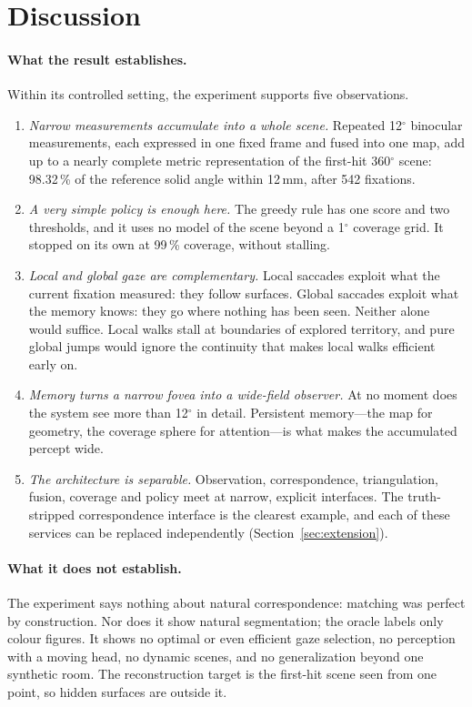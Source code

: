 \documentclass[11pt,a4paper]{article}
\newcommand{\pct}[1]{#1\,\%}
\newcommand{\degr}{\ensuremath{^\circ}}
\begin{document}
\section{Discussion}\label{sec:discussion}

\paragraph{What the result establishes.} Within its controlled setting, the experiment supports five observations.
\begin{enumerate}
  \item \emph{Narrow measurements accumulate into a whole scene.} Repeated 12\degr{} binocular measurements, each
        expressed in one fixed frame and fused into one map, add up to a nearly complete metric representation of the
        first-hit 360\degr{} scene: \pct{98.32} of the reference solid angle within 12\,mm, after 542 fixations.
  \item \emph{A very simple policy is enough here.} The greedy rule has one score and two thresholds, and it uses no
        model of the scene beyond a 1\degr{} coverage grid. It stopped on its own at \pct{99} coverage, without
        stalling.
  \item \emph{Local and global gaze are complementary.} Local saccades exploit what the current fixation measured:
        they follow surfaces. Global saccades exploit what the memory knows: they go where nothing has been seen.
        Neither alone would suffice. Local walks stall at boundaries of explored territory, and pure global jumps
        would ignore the continuity that makes local walks efficient early on.
  \item \emph{Memory turns a narrow fovea into a wide-field observer.} At no moment does the system see more than
        12\degr{} in detail. Persistent memory---the map for geometry, the coverage sphere for attention---is what makes
        the accumulated percept wide.
  \item \emph{The architecture is separable.} Observation, correspondence, triangulation, fusion, coverage and policy
        meet at narrow, explicit interfaces. The truth-stripped correspondence interface is the clearest example, and
        each of these services can be replaced independently (Section~\ref{sec:extension}).
\end{enumerate}

\paragraph{What it does not establish.} The experiment says nothing about natural correspondence: matching was perfect
by construction. Nor does it show natural segmentation; the oracle labels only colour figures. It shows no optimal or
even efficient gaze selection, no perception with a moving head, no dynamic scenes, and no generalization beyond one
synthetic room. The reconstruction target is the first-hit scene seen from one point, so hidden surfaces are outside
it.
\end{document}
